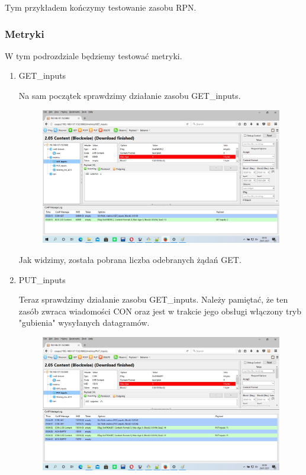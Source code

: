 Tym przykładem kończymy testowanie zasobu RPN.

\subsubsection{Metryki}

W tym podrozdziale będziemy testować metryki.


\begin{enumerate}

\item GET\_inputs

Na sam początek sprawdzimy działanie zasobu GET\_inputs.

\begin{figure}[h]
    \includegraphics[scale=0.4]{img/met_get_inputs.jpg}
\end{figure}
\vspace{0.5cm}

Jak widzimy, została pobrana liczba odebranych żądań GET.

\item PUT\_inputs

Teraz sprawdzimy działanie zasobu GET\_inputs. Należy pamiętać, że ten zasób zwraca wiadomości CON oraz jest w trakcie jego obsługi włączony tryb "gubienia" wysyłanych datagramów.

\begin{figure}[h]
    \includegraphics[scale=0.4]{img/met_put_inputs.jpg}
\end{figure}
\vspace{0.5cm}


\end{enumerate}
